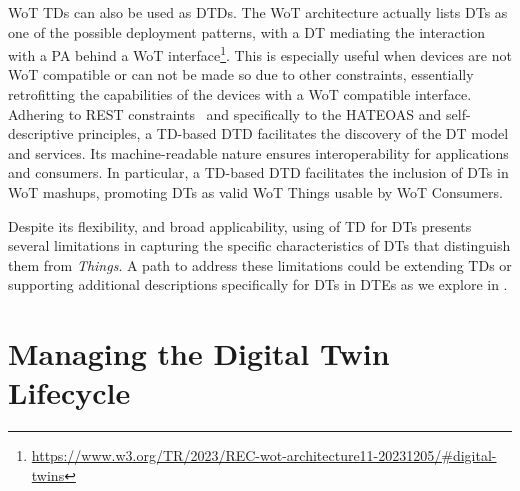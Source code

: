 \ac{WoT} \acp{TD} can also be used as \acp{DTD}.
The \ac{WoT} architecture actually lists \acp{DT} as one of the possible deployment patterns, with a \ac{DT} mediating the interaction with a \ac{PA} behind a \ac{WoT} interface\footnote{\url{https://www.w3.org/TR/2023/REC-wot-architecture11-20231205/\#digital-twins}}.
%
This is especially useful when devices are not \ac{WoT} compatible or can not be made so due to other constraints, essentially retrofitting the capabilities of the devices with a \ac{WoT} compatible interface.
%
Adhering to \ac{REST} constraints~\cite{fielding2000architectural} and specifically to the HATEOAS and self-descriptive principles, a \ac{TD}-based \ac{DTD} facilitates the discovery of the \ac{DT} model and services.
%
Its machine-readable nature ensures interoperability for applications and consumers.
%
In particular, a \ac{TD}-based \ac{DTD} facilitates the inclusion of \acp{DT} in \ac{WoT} mashups, promoting \acp{DT} as valid \ac{WoT} Things usable by \ac{WoT} Consumers.

Despite its flexibility,
and broad applicability, 
using of \ac{TD} for \acp{DT} presents several limitations in capturing the specific characteristics of \acp{DT} that distinguish them from \emph{Things}.
%
A path to address these limitations could be extending \acp{TD} or supporting additional descriptions specifically for \acp{DT} in \acp{DTE} as we explore in .



\section{Managing the Digital Twin Lifecycle}




